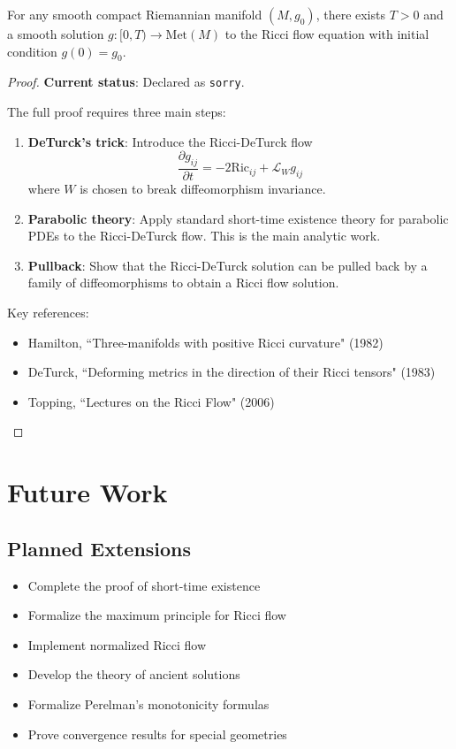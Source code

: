 \begin{theorem}
\label{thm:short_time_existence}
For any smooth compact Riemannian manifold $(M, g_0)$, there exists $T > 0$
and a smooth solution $g : [0, T) \to \mathrm{Met}(M)$ to the Ricci flow equation
with initial condition $g(0) = g_0$.
\end{theorem}

\begin{proof}
\textbf{Current status}: Declared as \texttt{sorry}.

The full proof requires three main steps:
\begin{enumerate}
\item \textbf{DeTurck's trick}: Introduce the Ricci-DeTurck flow
  \[ \frac{\partial g_{ij}}{\partial t} = -2 \mathrm{Ric}_{ij} + \mathcal{L}_W g_{ij} \]
  where $W$ is chosen to break diffeomorphism invariance.

\item \textbf{Parabolic theory}: Apply standard short-time existence theory for
  parabolic PDEs to the Ricci-DeTurck flow. This is the main analytic work.

\item \textbf{Pullback}: Show that the Ricci-DeTurck solution can be pulled back
  by a family of diffeomorphisms to obtain a Ricci flow solution.
\end{enumerate}

Key references:
\begin{itemize}
\item Hamilton, ``Three-manifolds with positive Ricci curvature" (1982)
\item DeTurck, ``Deforming metrics in the direction of their Ricci tensors" (1983)
\item Topping, ``Lectures on the Ricci Flow" (2006)
\end{itemize}
\end{proof}

\chapter{Future Work}

\section{Planned Extensions}

\begin{itemize}
\item Complete the proof of short-time existence
\item Formalize the maximum principle for Ricci flow
\item Implement normalized Ricci flow
\item Develop the theory of ancient solutions
\item Formalize Perelman's monotonicity formulas
\item Prove convergence results for special geometries
\end{itemize}

